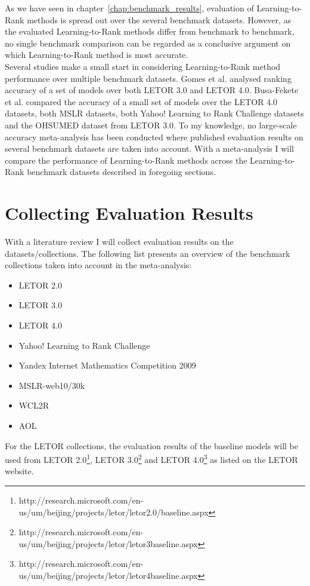 As we have seen in chapter~\ref{chap:benchmark_results}, evaluation of Learning-to-Rank methods is spread out over the several benchmark datasets. However, as the evaluated Learning-to-Rank methods differ from benchmark to benchmark, no single benchmark comparison can be regarded as a conclusive argument on which Learning-to-Rank method is most accurate.\\

Several studies make a small start in considering Learning-to-Rank method performance over multiple benchmark datasets. Gomes et al. \cite{Gomes2013} analysed ranking accuracy of a set of models over both LETOR 3.0 and LETOR 4.0. Busa-Fekete et al. \cite{Busa-Fekete2013} compared the accuracy of a small set of models over the LETOR 4.0 datasets, both MSLR datasets, both Yahoo! Learning to Rank Challenge datasets and the OHSUMED dataset from LETOR 3.0. To my knowledge, no large-scale accuracy meta-analysis has been conducted where published evaluation results on several benchmark datasets are taken into account. With a meta-analysis I will compare the performance of Learning-to-Rank methods across the Learning-to-Rank benchmark datasets described in foregoing sections.

\section{Collecting Evaluation Results}
\label{sec:collecting_evaluation_results}
With a literature review I will collect evaluation results on the datasets/collections. The following list presents an overview of the benchmark collections taken into account in the meta-analysis:
\begin{itemize}
\item LETOR 2.0
\item LETOR 3.0
\item LETOR 4.0
\item Yahoo! Learning to Rank Challenge
\item Yandex Internet Mathematics Competition 2009
\item MSLR-web10/30k
\item WCL2R
\item AOL
\end{itemize}

For the LETOR collections, the evaluation results of the baseline models will be used from LETOR 2.0\footnote{http://research.microsoft.com/en-us/um/beijing/projects/letor/letor2.0/baseline.aspx}, LETOR 3.0\footnote{http://research.microsoft.com/en-us/um/beijing/projects/letor/letor3baseline.aspx} and LETOR 4.0\footnote{http://research.microsoft.com/en-us/um/beijing/projects/letor/letor4baseline.aspx} as listed on the LETOR website.\\

